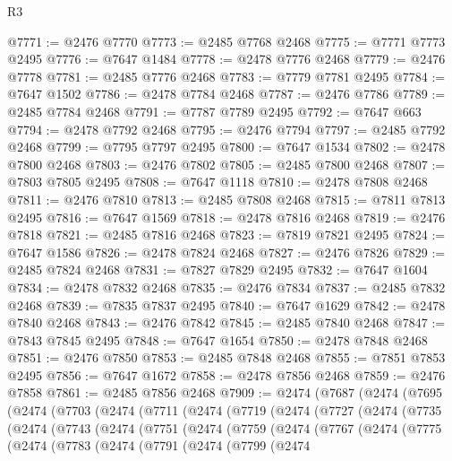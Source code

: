 \begin{lexlean}{R3}
\begin{coremodule}
@7771 := @2476 @7770
@7773 := @2485 @7768 @2468
@7775 := @7771 @7773 @2495
@7776 := @7647 @1484
@7778 := @2478 @7776 @2468
@7779 := @2476 @7778
@7781 := @2485 @7776 @2468
@7783 := @7779 @7781 @2495
@7784 := @7647 @1502
@7786 := @2478 @7784 @2468
@7787 := @2476 @7786
@7789 := @2485 @7784 @2468
@7791 := @7787 @7789 @2495
@7792 := @7647 @663
@7794 := @2478 @7792 @2468
@7795 := @2476 @7794
@7797 := @2485 @7792 @2468
@7799 := @7795 @7797 @2495
@7800 := @7647 @1534
@7802 := @2478 @7800 @2468
@7803 := @2476 @7802
@7805 := @2485 @7800 @2468
@7807 := @7803 @7805 @2495
@7808 := @7647 @1118
@7810 := @2478 @7808 @2468
@7811 := @2476 @7810
@7813 := @2485 @7808 @2468
@7815 := @7811 @7813 @2495
@7816 := @7647 @1569
@7818 := @2478 @7816 @2468
@7819 := @2476 @7818
@7821 := @2485 @7816 @2468
@7823 := @7819 @7821 @2495
@7824 := @7647 @1586
@7826 := @2478 @7824 @2468
@7827 := @2476 @7826
@7829 := @2485 @7824 @2468
@7831 := @7827 @7829 @2495
@7832 := @7647 @1604
@7834 := @2478 @7832 @2468
@7835 := @2476 @7834
@7837 := @2485 @7832 @2468
@7839 := @7835 @7837 @2495
@7840 := @7647 @1629
@7842 := @2478 @7840 @2468
@7843 := @2476 @7842
@7845 := @2485 @7840 @2468
@7847 := @7843 @7845 @2495
@7848 := @7647 @1654
@7850 := @2478 @7848 @2468
@7851 := @2476 @7850
@7853 := @2485 @7848 @2468
@7855 := @7851 @7853 @2495
@7856 := @7647 @1672
@7858 := @2478 @7856 @2468
@7859 := @2476 @7858
@7861 := @2485 @7856 @2468
@7909 := @2474
    (@7687
      (@2474
        (@7695
          (@2474
            (@7703
              (@2474
                (@7711
                  (@2474
                    (@7719
                      (@2474
                        (@7727
                          (@2474
                            (@7735
                              (@2474
                                (@7743
                                  (@2474
                                    (@7751
                                      (@2474
                                        (@7759
                                          (@2474
                                            (@7767
                                              (@2474
                                                (@7775
                                                  (@2474
                                                    (@7783
                                                      (@2474
                                                        (@7791
                                                          (@2474
                                                            (@7799
                                                              (@2474

\end{coremodule}
\end{lexlean}

